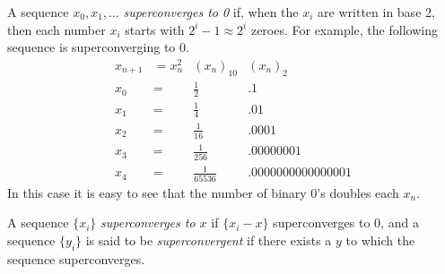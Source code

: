 \documentclass{article}
\begin{document}
A sequence $x_0,x_1,\dots$ \emph{superconverges to 0} if, when the $x_i$ are written in base 2, then each number $x_i$ starts with $2^i-1\approx 2^i$ zeroes.
For example, the following sequence is superconverging to 0.
$$\begin{array}{clcl}
x_{n+1}&=x_n^2 & (x_n)_{10} & (x_n)_2\\[1.5pt]
x_0 &= & \frac{1}{2} & .1\\[1.5pt]
x_1 &= & \frac{1}{4} & .01\\[1.5pt]
x_2 &= & \frac{1}{16} & .0001\\[1.5pt]
x_3 &= & \frac{1}{256} & .00000001\\[1.5pt]
x_4 &= & \frac{1}{65536} & .0000000000000001
\end{array}$$
In this case it is easy to see that the number of binary 0's doubles each $x_n$.

A sequence $\{x_i\}$ \emph{superconverges to $x$} if $\{x_i-x\}$ superconverges  to 0, and a sequence $\{y_i\}$ is said to be \emph{superconvergent} if there exists a $y$ to which the sequence superconverges.
\end{document}
